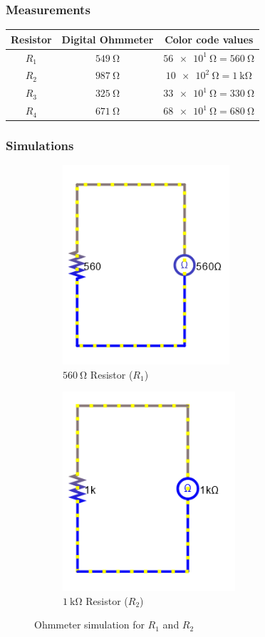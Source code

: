\documentclass[a4paper]{article}
\begin{document}
\subsubsection{Measurements}
\begin{center}
\begin{tabular}{|c|c|c|}
\hline
Resistor & Digital Ohmmeter & Color code values\\ \hline
$R_1$ & $\SI{549}{\ohm}$ & $\SI{56e1}{\ohm}=\SI{560}{\ohm}$ \\ \hline
$R_2$ & $\SI{987}{\ohm}$ & $\SI{10e2}{\ohm}=\SI{1}{\kilo\ohm}$ \\ \hline
$R_3$ & $\SI{325}{\ohm}$ & $\SI{33e1}{\ohm}=\SI{330}{\ohm}$ \\ \hline
$R_4$ & $\SI{671}{\ohm}$ & $\SI{68e1}{\ohm}=\SI{680}{\ohm}$ \\ \hline
\end{tabular}
\end{center}
\subsubsection{Simulations}
\begin{figure}[H]
\begin{subfigure}{0.48\textwidth}
\includegraphics[width=\linewidth,height=7.4cm]{ohm_560}
\caption{$\SI{560}{\ohm}$ Resistor ($R_1$)}
\end{subfigure}
\begin{subfigure}{0.48\textwidth}
\includegraphics[width=\linewidth,height=7.4cm]{ohm_1k}
\caption{$\SI{1}{\kilo\ohm}$ Resistor ($R_2$)}
\end{subfigure}
\caption{Ohmmeter simulation for $R_1$ and $R_2$}
\label{fig:1}
\end{figure}
\end{document}
